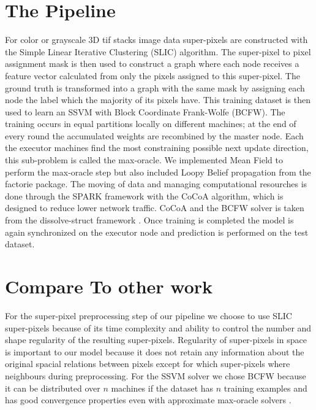 \section{The Pipeline}
For color or grayscale 3D tif stacks image data super-pixels are constructed with the Simple Linear Iterative Clustering (SLIC) algorithm. The super-pixel to pixel assignment mask is then used to construct a graph where each node receives a feature vector calculated from only the pixels assigned to this super-pixel. The ground truth is transformed into a graph with the same mask by assigning each node the label which the majority of its pixels have. This training dataset is then used to learn an SSVM with Block Coordinate Frank-Wolfe  (BCFW). The training occurs in equal partitions locally on different machines; at the end of every round the accumulated weights are recombined by the master node. Each the executor machines find the most constraining possible next update direction, this sub-problem is called the max-oracle. We implemented Mean Field to perform the max-oracle step but also included Loopy Belief propagation from the factorie package\cite{mccallum09:factorie:}.  The moving of data and managing computational resourches is done through the SPARK framework\cite{spark} with the CoCoA algorithm, which is designed to reduce lower network traffic. CoCoA and the BCFW solver is taken from the dissolve-struct framework \cite{dissolvestructWeb}. Once training is completed the model is again synchronized on the executor node and prediction is performed on the test dataset. 


\section{Compare To other work}

For the super-pixel preprocessing step of our pipeline we choose to use SLIC super-pixels because of its time complexity and ability to control the number and shape regularity of the resulting super-pixels. Regularity of super-pixels in space is important to our model because it does not retain any information about the original spacial relations between pixels except for which super-pixels where neighbours during preprocessing. For the SSVM solver we chose BCFW because it can be distributed over $n$ machines if the dataset has $n$ training examples and has good convergence properties even with approximate max-oracle solvers \cite{lacoste2012block}.

